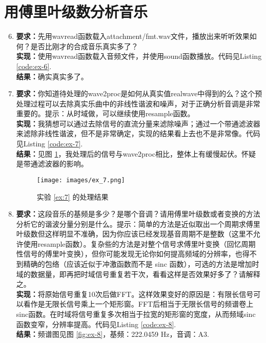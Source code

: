 \documentclass[utf8]{article}
\begin{document}
\section{用傅里叶级数分析音乐}
\begin{enumerate}
    \setcounter{enumi}{5}
    \item \label{ex:6}\textbf{要求：}先用wavread函数载入attachment/fmt.wav文件，播放出来听听效果如何？是否比刚才的合成音乐真实多了？ \\
        \textbf{实现：}使用wavread函数载入音频文件，并使用sound函数播放。代码见Listing \ref{code:ex-6}. \\
        \textbf{结果：}确实真实多了。
    \item \label{ex:7}\textbf{要求：}你知道待处理的wave2proc是如何从真实值realwave中得到的么？这个预处理过程可以去除真实乐曲中的非线性谐波和噪声，对于正确分析音调是非常重要的。提示：从时域做，可以继续使用resample函数。 \\
        \textbf{实现：}我猜想可以通过去除信号的直流分量来滤除噪声；通过一个带通滤波器来滤除非线性谐波，但不是非常确定，实现的结果看上去也不是非常像。代码见Listing \ref{code:ex-7}. \\
        \textbf{结果：}见图 \ref{fig:ex-7}，我处理后的信号与wave2proc相比，整体上有缓慢起伏。怀疑是带通滤波器的影响。
        \begin{figure}[H]
            \centering
            \texttt{[image: images/ex\_7.png]}
            \vspace{-2em}
            \caption{实验 \ref{ex:7} 的处理结果}
            \label{fig:ex-7}
        \end{figure}
    \item \label{ex:8}\textbf{要求：}这段音乐的基频是多少？是哪个音调？请用傅里叶级数或者变换的方法分析它的谐波分量分别是什么。提示：简单的方法是近似取出一个周期求傅里叶级数但这样明显不准确，因为你应该已经发现基音周期不是整数（这里不允许使用resample函数）。复杂些的方法是对整个信号求傅里叶变换（回忆周期性信号的傅里叶变换），但你可能发现无论你如何提高频域的分辨率，也得不到精确的包络（应该近似于冲激函数而不是 sinc 函数），可选的方法是增加时域的数据量，即再把时域信号重复若干次，看看这样是否效果好多了？请解释之。 \\
        \textbf{实现：}将原始信号重复10次后做FFT。这样效果变好的原因是：有限长信号可以看作是无限长信号乘上一个矩形窗。FFT后相当于无限长信号的频谱卷上sinc函数。在时域将信号重复多次相当于拉宽的矩形窗的宽度，从而频域sinc函数变窄，分辨率提高。代码见Listing \ref{code:ex-8}. \\
        \textbf{结果：}频谱图见图 \ref{fig:ex-8}，基频：222.0459 Hz，音调：A3.

\end{enumerate}
\end{document}
